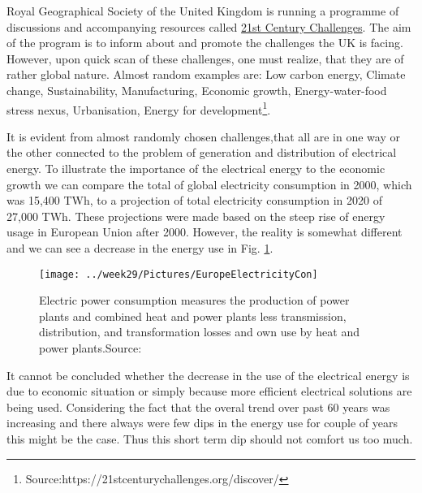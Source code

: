 \documentclass[]{scrartcl}
\begin{document}

Royal Geographical Society of the United Kingdom is running a programme of discussions and accompanying resources called \href{<https://21stcenturychallenges.org/discover/>}{21st Century Challenges}. The aim of the program is to inform about and promote the challenges the UK is facing. However, upon quick scan of these challenges, one must realize, that they are of rather global nature. Almost random examples are: Low carbon energy, Climate change, Sustainability, Manufacturing, Economic growth, Energy-water-food stress nexus, Urbanisation, Energy for development\footnote{Source:https://21stcenturychallenges.org/discover/}.

It is evident from almost randomly chosen challenges,that all are in one way or the other connected to the problem of generation and distribution of electrical energy.  To illustrate the importance of the electrical energy to the economic growth we can compare the total of global electricity consumption in 2000, which was 15,400 TWh, to a projection of total electricity consumption in 2020 of 27,000 TWh\cite{Garrity2009}. These projections were made based on the steep rise of energy usage in European Union after 2000. However, the reality is somewhat different and we can see a decrease in the energy use in Fig. \ref{fig:europeelectricitycon}. 

\begin{figure}[h!]
	\centering
	\texttt{[image: ../week29/Pictures/EuropeElectricityCon]}
	\caption{Electric power consumption measures the production of power plants and combined heat and power plants less transmission, distribution, and transformation losses and own use by heat and power plants.Source:}
	\label{fig:europeelectricitycon}
\end{figure}
\newpage

It cannot be concluded whether the decrease in the use of the electrical energy is due to economic situation or simply because more efficient electrical solutions are being used. Considering the fact that the overal trend over past 60 years was increasing and there always were few dips in the energy use for couple of years this might be the case. Thus this short term dip should not comfort us too much.
 
\end{document}
